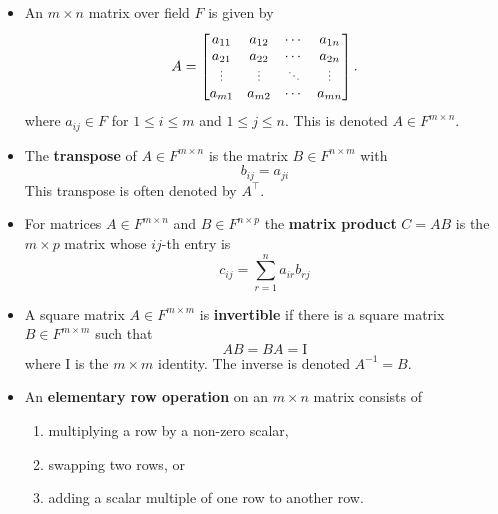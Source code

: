 \documentclass[11pt,twoside]{report}
\newcommand{\Id}{{\mathrm{I}}}
\begin{document}
  \begin{itemize}
  \item An $m \times n$ matrix over field $F$ is given by 
  \begin{equation*}
A = \begin{bmatrix}
a_{11} & a_{12} & \cdots & a_{1n} \\
a_{21} & a_{22} & \cdots & a_{2n} \\
\scalebox{0.75}{\vdots} & \scalebox{0.75}{\vdots} & \scalebox{0.75}{$\ddots$} & \scalebox{0.75}{\vdots} \\
a_{m1} & a_{m2} & \cdots & a_{mn}
\end{bmatrix}.
\end{equation*}
where $a_{ij} \in F$ for $1 \le i \le m$ and $1 \le j \le n$. This is denoted $A \in F^{m \times n}$. 

\item The \textbf{transpose} of $A \in F^{m \times n}$ is the  matrix $B \in F^{n \times m}$ with 
\[
b_{ij} = a_{ji}
\]
This transpose is often denoted by $A^\top$. 
  
  
  \item For matrices $A \in F^{m \times n}$ and $B \in F^{n \times p}$ the \textbf{matrix product}  $C = AB$ is the $m \times p$ matrix whose $ij$-th entry is 
  \[
  c_{ij} = \sum_{r = 1}^n a_{ir} b_{rj} 
  \]
  
  
  \item 
A square matrix $A \in F^{m\times m}$ is \textbf{invertible} if there is a square matrix $B \in F^{m\times m}$ such that 
\[
AB=BA=\Id 
\]
where $\Id $ is the $m\!\times\! m$ identity.  The inverse is denoted $A^{-1}=B$.

\item  An \textbf{elementary row operation} on an $m \times n$ matrix consists of
\begin{enumerate}
\item multiplying a row by a non-zero scalar,
\item swapping two rows, or
\item adding a scalar multiple of one row to another row.
\end{enumerate}



\end{itemize}
\end{document}
